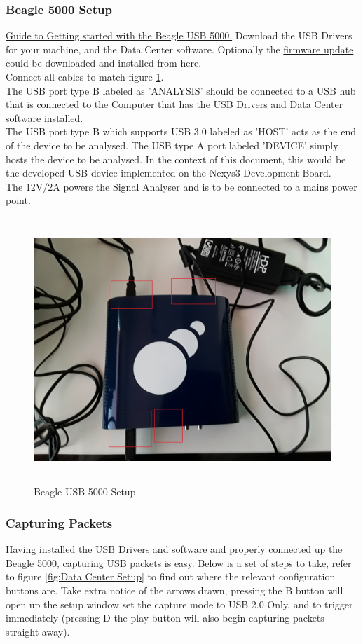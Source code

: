 \documentclass[10pt,a4paper]{article}
\begin{document}
\subsubsection{Beagle 5000 Setup}
\href{https://www.totalphase.com/support/articles/200801823-Getting-Started-Beagle-USB-5000-v2-SuperSpeed-Standard-Protocol-Analyzer}{Guide to Getting started with the Beagle USB 5000.}
Download the USB Drivers for your machine, and the Data Center software. Optionally the \href{https://www.totalphase.com/products/beagle-5000-firmware-utility/}{firmware update} could be downloaded and installed from here. \\
Connect all cables to match figure \ref{fig:Beagle USB 5000}. \\
The USB port type B labeled as 'ANALYSIS' should be connected to a USB hub that is connected to the Computer that has the USB Drivers and Data Center software installed.\\
The USB port type B which supports USB 3.0 labeled as 'HOST' acts as the end of the device to be analysed. The USB type A port labeled 'DEVICE' simply hosts the device to be analysed. In the context of this document, this would be the developed USB device implemented on the Nexys3 Development Board. \\
The 12V/2A powers the Signal Analyser and is to be connected to a mains power point.
\begin{figure}[h]
	\includegraphics[width=12cm, height=10cm]{beagle_5000.jpg}
	\caption{Beagle USB 5000 Setup}
	\label{fig:Beagle USB 5000}
\end{figure}

\subsubsection{Capturing Packets}
Having installed the USB Drivers and software and properly connected up the Beagle 5000, capturing USB packets is easy. Below is a set of steps to take, refer to figure \ref{fig:Data Center Setup} to find out where the relevant configuration buttons are. Take extra notice of the arrows drawn, pressing the B button will open up the setup window set the capture mode to USB 2.0 Only, and to trigger immediately (pressing D the play button will also begin capturing packets straight away).
\end{document}
